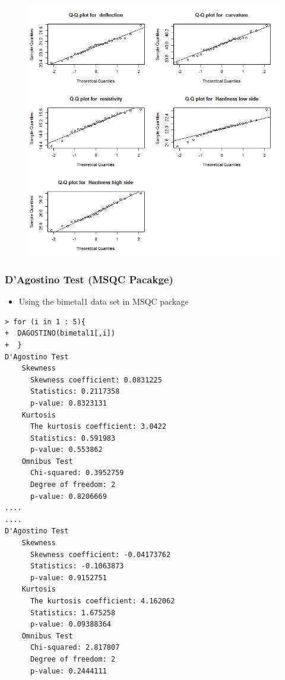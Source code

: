 \documentclass[]{article}
\begin{document}
\newpage
\begin{figure}[h!]
\centering
\includegraphics[width=0.9\linewidth]{./MSQC-bimetal1qq}
\caption{}
\label{fig:MSQC-bimetal1qq}
\end{figure}
\newpage
\subsubsection{D'Agostino Test (MSQC Pacakge)}
\begin{itemize}
\item Using the bimetal1 data set in MSQC package
\end{itemize}
\begin{framed}
\begin{verbatim}
> for (i in 1 : 5){
+  DAGOSTINO(bimetal1[,i])
+  }
D'Agostino Test
    Skewness
      Skewness coefficient: 0.0831225 
      Statistics: 0.2117358 
      p-value: 0.8323131 
    Kurtosis
      The kurtosis coefficient: 3.0422 
      Statistics: 0.591983 
      p-value: 0.553862 
    Omnibus Test
      Chi-squared: 0.3952759 
      Degree of freedom: 2
      p-value: 0.8206669 
....
....
D'Agostino Test
    Skewness
      Skewness coefficient: -0.04173762 
      Statistics: -0.1063873 
      p-value: 0.9152751 
    Kurtosis
      The kurtosis coefficient: 4.162062 
      Statistics: 1.675258 
      p-value: 0.09388364 
    Omnibus Test
      Chi-squared: 2.817807 
      Degree of freedom: 2
      p-value: 0.2444111 
\end{verbatim}
\end{framed}
\newpage
\end{document}
